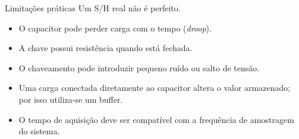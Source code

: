 \begin{frame}{Limitações práticas}
  Um S/H real não é perfeito.
  \begin{itemize}
    \item O capacitor pode perder carga com o tempo (\textit{droop}).
    \item A chave possui resistência quando está fechada.
    \item O chaveamento pode introduzir pequeno ruído ou salto de tensão.
    \item Uma carga conectada diretamente ao capacitor altera o valor armazenado; por isso utiliza-se um buffer.
    \item O tempo de aquisição deve ser compatível com a frequência de amostragem do sistema.
  \end{itemize}
\end{frame}